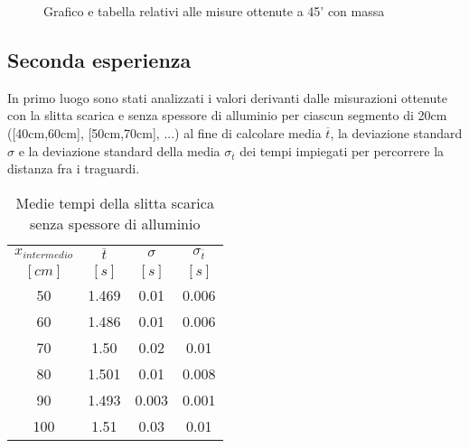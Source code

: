 \documentclass[a4paper,11pt,oneside]{article}
\begin{document}
\begin{figure}[h!]
    \centering
    \caption{Grafico e tabella relativi alle misure ottenute a 45' con massa}
\end{figure}
\newpage
\subsection{Seconda esperienza}
In primo luogo sono stati analizzati i valori derivanti dalle misurazioni ottenute con la slitta scarica e senza spessore di alluminio per ciascun segmento di 20cm ([40cm,60cm], [50cm,70cm], ...) al fine di calcolare media $\overline{t}$, la deviazione standard $\sigma$ e la deviazione standard della media $\sigma_{\overline{t}}$ dei tempi impiegati per percorrere la distanza fra i traguardi.\\

\begin{table}[h!]%
\centering
\begin{tabular}{c|ccc}
\toprule
$x_{intermedio}$&$\overline{t}$&$\sigma$&$\sigma_{\overline{t}}$\\
$[\si{cm}]$&$[\si{s}]$&$[\si{s}]$&$[\si{s}]$\\
\midrule
50	&1.469	&0.01	&0.006\\
60	&1.486	    &0.01	&0.006\\
70	&1.50	&0.02	&0.01\\
80	&1.501	&0.01	&0.008\\
90	&1.493	&0.003	&0.001\\
100	&1.51	&0.03	&0.01\\
\bottomrule
\end{tabular}
    \caption{Medie tempi della slitta scarica senza spessore di alluminio}
    \label{tab:nm_na}
\end{table}
\end{document}

